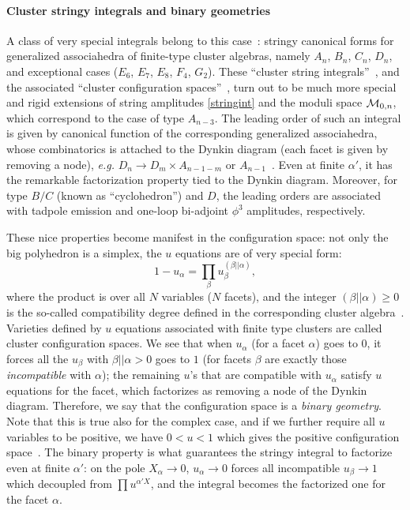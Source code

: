 \documentclass[hidelinks,12pt]{article}
\begin{document}
\paragraph{Cluster stringy integrals and binary geometries} A class of very special integrals belong to this case~\cite{Arkani-Hamed:2019plo}: stringy canonical forms for generalized associahedra of finite-type cluster algebras, namely $A_n$, $B_n$, $C_n$, $D_n$, and exceptional cases ($E_6$, $E_7$, $E_8$, $F_4$, $G_2$). These ``cluster string integrals''~\cite{Arkani-Hamed:2019plo}, and the associated ``cluster configuration spaces''~\cite{Arkani-Hamed:2019plo,Arkani-Hamed:tobeappear}, turn out to be much more special and rigid extensions of string amplitudes \eqref{stringint} and the moduli space ${\cal M}_{0,n}$, which correspond to the case of type $A_{n{-}3}$. The leading order of such an integral is given by canonical function of the corresponding generalized associahedra, whose combinatorics is attached to the Dynkin diagram (each facet is given by removing a node), {\it e.g.} $D_n \to D_m \times A_{n{-}1{-}m}$ or $A_{n{-}1}$~\cite{Arkani-Hamed:2019plo}. Even at finite $\alpha'$, it has the remarkable factorization property tied to the Dynkin diagram. Moreover, for type $B/C$ (known as ``cyclohedron'') and $D$, the leading orders are associated with tadpole emission and one-loop bi-adjoint $\phi^3$ amplitudes, respectively.

These nice properties become manifest in the configuration space: not only the big polyhedron is a simplex, the $u$ equations are of very special form:
\begin{equation}\label{perfectu}
	1-u_\alpha=\prod_{\beta} u_\beta^{(\beta||\alpha)},
\end{equation}
where the product is over all $N$ variables ($N$ facets), and the integer $(\beta || \alpha)\geq 0$ is the so-called compatibility degree defined in the corresponding cluster algebra~\cite{Zelevinskysys}. Varieties defined by $u$ equations associated with finite type clusters  are called cluster configuration spaces.
We see that when $u_\alpha$ (for a facet $\alpha$) goes to $0$, it forces all the $u_\beta$ with $\beta || \alpha>0$ goes to $1$ (for facets $\beta$ are exactly those {\it incompatible} with $\alpha$); the remaining $u$'s that are compatible with $u_\alpha$ satisfy $u$ equations for the facet, which factorizes as removing a node of the Dynkin diagram. Therefore, we say that the configuration space is a {\it binary geometry}. Note that this is true also for the complex case, and if we further require all $u$ variables to be positive, we have $0<u<1$ which gives the positive configuration space~\cite{Arkani-Hamed:2020cig}. The binary property is what guarantees the stringy integral to factorize even at finite $\alpha'$: on the pole $X_\alpha \to 0$, $u_\alpha\to 0$ forces all incompatible $u_\beta\to 1$ which decoupled from $\prod u^{\alpha' X}$, and the integral becomes the factorized one for the facet $\alpha$. 
\end{document}

